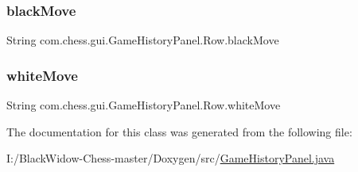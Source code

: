 \subsubsection{\texorpdfstring{blackMove}{blackMove}}
{\footnotesize\ttfamily String com.\+chess.\+gui.\+Game\+History\+Panel.\+Row.\+black\+Move\hspace{0.3cm}{\ttfamily [private]}}

\mbox{\label{classcom_1_1chess_1_1gui_1_1_game_history_panel_1_1_row_ae9107b2e25a0c9330fc89c14b1458c75}} 
\subsubsection{\texorpdfstring{whiteMove}{whiteMove}}
{\footnotesize\ttfamily String com.\+chess.\+gui.\+Game\+History\+Panel.\+Row.\+white\+Move\hspace{0.3cm}{\ttfamily [private]}}



The documentation for this class was generated from the following file\+:\begin{DoxyCompactItemize}
\item 
I\+:/\+Black\+Widow-\/\+Chess-\/master/\+Doxygen/src/\mbox{\hyperlink{_game_history_panel_8java}{Game\+History\+Panel.\+java}}\end{DoxyCompactItemize}
